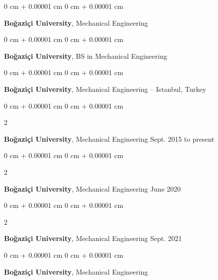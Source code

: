 \documentclass[10pt, letterpaper]{article}
\newenvironment{onecolentry}{
    \begin{adjustwidth}{
        0 cm + 0.00001 cm
    }{
        0 cm + 0.00001 cm
    }
}{
    \end{adjustwidth}
} %
\newenvironment{twocolentry}[2][]{
    \onecolentry
    \def\secondColumn{#2}
    \setcolumnwidth{\fill, 4.5 cm}
    \begin{paracol}{2}
}{
    \switchcolumn \raggedleft \secondColumn
    \end{paracol}
    \endonecolentry
} %
\begin{document}
        
        \begin{onecolentry}
            \textbf{Boğaziçi University}, Mechanical Engineering\end{onecolentry}



        \vspace{0.2 cm}

        \begin{onecolentry}
            \textbf{Boğaziçi University}, BS in Mechanical Engineering\end{onecolentry}



        \vspace{0.2 cm}

        \begin{onecolentry}
            \textbf{Boğaziçi University}, Mechanical Engineering -- Istanbul, Turkey\end{onecolentry}



        \vspace{0.2 cm}

        \begin{twocolentry}{
            Sept. 2015 to present
        }
            \textbf{Boğaziçi University}, Mechanical Engineering\end{twocolentry}



        \vspace{0.2 cm}

        \begin{twocolentry}{
            June 2020
        }
            \textbf{Boğaziçi University}, Mechanical Engineering\end{twocolentry}



        \vspace{0.2 cm}

        \begin{twocolentry}{
            Sept. 2021
        }
            \textbf{Boğaziçi University}, Mechanical Engineering\end{twocolentry}



        \vspace{0.2 cm}

        \begin{onecolentry}
            \textbf{Boğaziçi University}, Mechanical Engineering\end{onecolentry}
\end{document}

